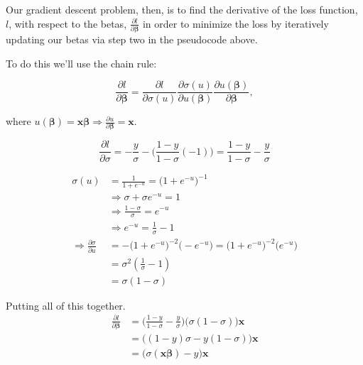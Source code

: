 \documentclass[a4paper, 12pt]{article}
\begin{document}
Our gradient descent problem, then, is to find the derivative of the loss function, $l$, with respect to the betas, $\frac{\partial l}{\partial \bm{\beta}}$ in order to minimize the loss by iteratively updating our betas via step two in the pseudocode above.

\vspace{1pc}

To do this we'll use the chain rule:

  $$ \frac{\partial l}{\partial \bm{\beta}} = \frac{\partial l}{\partial \sigma(u)} \frac{\partial \sigma(u)}{\partial u(\bm{\beta})} \frac{\partial u(\bm{\beta})}{\partial \bm{\beta}}, $$

where $u(\bm{\beta}) = \bm{x \beta} \Rightarrow \frac{\partial u}{\partial \bm{\beta}} = \bm{x}$.

  $$ \frac{\partial l}{\partial \sigma} = -\frac{y}{\sigma} - \bigg(\frac{1-y}{1-\sigma} (-1)\bigg) = \frac{1-y}{1-\sigma} - \frac{y}{\sigma} $$

  \begin{align*}
    \sigma(u) &= \frac{1}{1 + e^{-u}} = \big(1 + e^{-u}\big)^{-1} \\
    &\Rightarrow \sigma + \sigma e^{-u} = 1 \\
    &\Rightarrow \frac{1 - \sigma}{\sigma} = e^{-u} \\
    &\Rightarrow e^{-u} = \frac{1}{\sigma} - 1 \\
    \Rightarrow \frac{\partial \sigma}{\partial u} &= -\big(1 + e^{-u}\big)^{-2}\big(-e^{-u}\big) = \big(1 + e^{-u}\big)^{-2}\big(e^{-u}\big)\\
    &= \sigma^2 (\frac{1}{\sigma} - 1) \\
    &= \sigma(1 - \sigma)
  \end{align*}

Putting all of this together.
  \begin{align*}
    \frac{\partial l}{\partial \bm{\beta}} &= \bigg(\frac{1-y}{1-\sigma} - \frac{y}{\sigma}\bigg) \big(\sigma(1 - \sigma)) \bm{x} \\
    &= \big((1 - y) \sigma - y (1 - \sigma)\big) \bm{x} \\
    &= \big(\sigma(\bm{x \beta}) - y\big) \bm{x}
  \end{align*}
\end{document}
